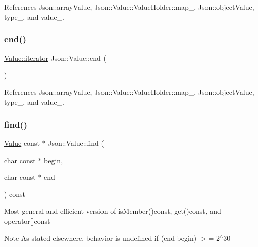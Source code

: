 References Json\+::array\+Value, Json\+::\+Value\+::\+Value\+Holder\+::map\+\_\+, Json\+::object\+Value, type\+\_\+, and value\+\_\+.

\mbox{\label{classJson_1_1Value_a2f961eff73f7f79cd29260b6cbd42558_a2f961eff73f7f79cd29260b6cbd42558}} 
\subsubsection{\texorpdfstring{end()}{end()}\hspace{0.1cm}{\footnotesize\ttfamily [2/2]}}
{\footnotesize\ttfamily \hyperlink{classJson_1_1Value_a341cdf2e01f8b3c5b7317aa2f0768c53_a341cdf2e01f8b3c5b7317aa2f0768c53}{Value\+::iterator} Json\+::\+Value\+::end (\begin{DoxyParamCaption}{ }\end{DoxyParamCaption})}



References Json\+::array\+Value, Json\+::\+Value\+::\+Value\+Holder\+::map\+\_\+, Json\+::object\+Value, type\+\_\+, and value\+\_\+.

\mbox{\label{classJson_1_1Value_afb007b9ce9b2cf9d5f667a07e5e0349f_afb007b9ce9b2cf9d5f667a07e5e0349f}} 
\subsubsection{\texorpdfstring{find()}{find()}}
{\footnotesize\ttfamily \hyperlink{classJson_1_1Value}{Value} const  $\ast$ Json\+::\+Value\+::find (\begin{DoxyParamCaption}\item[{char const $\ast$}]{begin,  }\item[{char const $\ast$}]{end }\end{DoxyParamCaption}) const}

Most general and efficient version of is\+Member()const, get()const, and operator\mbox{[}\mbox{]}const \begin{DoxyNote}{Note}
As stated elsewhere, behavior is undefined if (end-\/begin) $>$= 2$^\wedge$30 
\end{DoxyNote}


